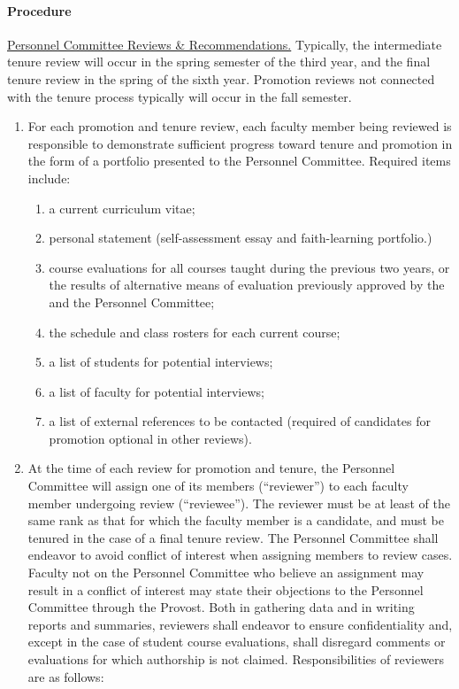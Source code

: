 			\paragraph{Procedure}
				\label{sec:PromotionEvaluationProcedure}
				\underline{Personnel Committee Reviews \& Recommendations.}  Typically, the intermediate tenure review will occur in the spring semester of the third year, and the final tenure review in the spring of the sixth year.  Promotion reviews not connected with the tenure process typically will occur in the fall semester.
				\begin{enumerate}[label=\alph*)]
					\item{For each promotion and tenure review, each faculty member being reviewed is responsible to demonstrate sufficient progress toward tenure and promotion in the form of a portfolio presented to the Personnel Committee.
						Required items include:
						\begin{enumerate}[label=\arabic*)]
							\item{a current curriculum vitae;}
							\item{personal statement (self-assessment essay and faith-learning portfolio.)}
							\item{course evaluations for all courses taught during the previous two years, or the results of alternative means of evaluation previously approved by the and the Personnel Committee;}
							\item{the schedule and class rosters for each current course;}
							\item{a list of students for potential interviews;}
							\item{a list of faculty for potential interviews;}
							\item{a list of external references to be contacted (required of candidates for promotion  optional in other reviews).}
						\end{enumerate}
					}
					\item{At the time of each review for promotion and tenure, the Personnel Committee will assign one of its members (``reviewer'') to each faculty member undergoing review (``reviewee'').  The reviewer must be at least of the same rank as that for which the faculty member is a candidate, and must be tenured in the case of a final tenure review.  The Personnel Committee shall endeavor to avoid conflict of interest when assigning members to review cases.  Faculty not on the Personnel Committee who believe an assignment may result in a conflict of interest may state their objections to the Personnel Committee through the Provost.  Both in gathering data and in writing reports and summaries, reviewers shall endeavor to ensure confidentiality and, except in the case of student course evaluations, shall disregard comments or evaluations for which authorship is not claimed.  Responsibilities of reviewers are as follows:
}
\end{enumerate}

